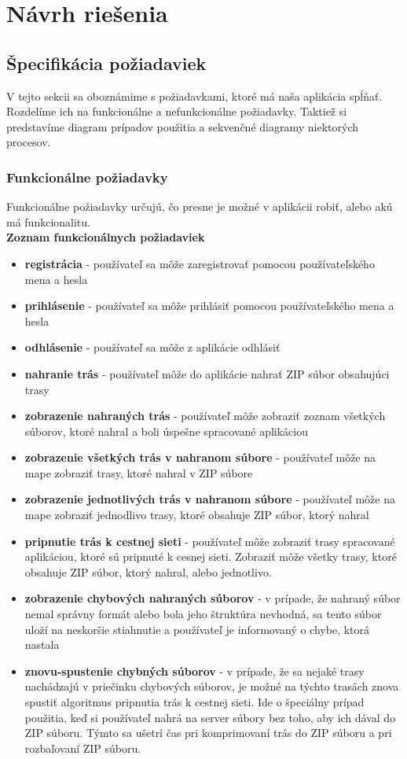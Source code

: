 \section{Návrh riešenia}
\subsection{Špecifikácia požiadaviek}
V tejto sekcii sa oboznámime s požiadavkami, ktoré má naša aplikácia spĺňať. Rozdelíme ich na funkcionálne a nefunkcionálne požiadavky. Taktiež si predstavíme diagram prípadov použitia a sekvenčné diagramy niektorých procesov.
\subsubsection{Funkcionálne požiadavky}
Funkcionálne požiadavky určujú, čo presne je možné v aplikácii robiť, alebo akú má funkcionalitu.\\
\textbf{Zoznam funkcionálnych požiadaviek}
\begin{itemize}
    \item \textbf{registrácia} - používateľ sa môže zaregistrovať pomocou používateľského mena a hesla
    \item \textbf{prihlásenie} - používateľ sa môže prihlásiť pomocou používateľského mena a hesla
    \item \textbf{odhlásenie} - používateľ sa môže z aplikácie odhlásiť
    \item \textbf{nahranie trás} - používateľ môže do aplikácie nahrať ZIP súbor obsahujúci trasy
    \item \textbf{zobrazenie nahraných trás} - používateľ môže zobraziť zoznam všetkých súborov, ktoré nahral a boli úspešne spracované aplikáciou
    \item \textbf{zobrazenie všetkých trás v nahranom súbore} - používateľ môže na mape zobraziť trasy, ktoré nahral v ZIP súbore
    \item \textbf{zobrazenie jednotlivých trás v nahranom súbore} - používateľ môže na mape zobraziť jednodlivo trasy, ktoré obsahuje ZIP súbor, ktorý nahral
    \item \textbf{pripnutie trás k cestnej sieti} - používateľ môže zobraziť trasy spracované aplikáciou, ktoré sú pripnuté k cesnej sieti. Zobraziť môže všetky trasy, ktoré obsahuje ZIP súbor, ktorý nahral, alebo jednotlivo.
    \item \textbf{zobrazenie chybových nahraných súborov} - v prípade, že nahraný súbor nemal správny formát alebo bola jeho štruktúra nevhodná, sa tento súbor uloží na neskoršie stiahnutie a používateľ je informovaný o chybe, ktorá nastala
    \item \textbf{znovu-spustenie chybných súborov} - v prípade, že sa nejaké trasy nachádzajú v priečinku chybových súborov, je možné na týchto trasách znova spustiť algoritmus pripnutia trás k cestnej sieti. Ide o špeciálny prípad použitia, keď si používateľ nahrá na server súbory bez toho, aby ich dával do ZIP súboru. Týmto sa ušetrí čas pri komprimovaní trás do ZIP súboru a pri rozbaľovaní ZIP súboru.
\end{itemize}
